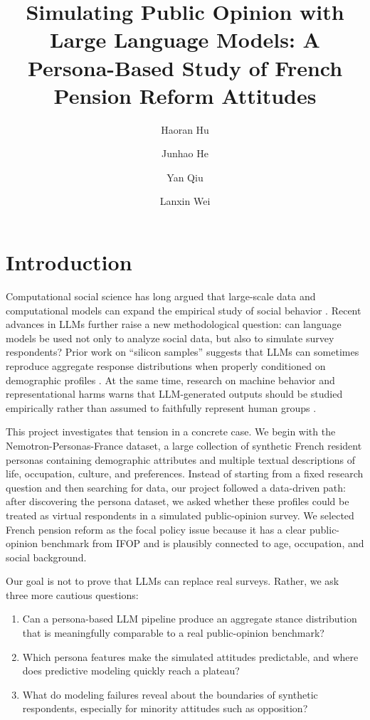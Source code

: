 ﻿\documentclass[sigconf,nonacm]{acmart}
\title{Simulating Public Opinion with Large Language Models: A Persona-Based Study of French Pension Reform Attitudes}
\author{Haoran Hu}
\author{Junhao He}
\author{Yan Qiu}
\author{Lanxin Wei}
\affiliation{%
  \institution{School of Information Management, Nanjing University}
  \country{China}
}
\newcommand{\dataset}{Nemotron-Personas-France}
\newcommand{\ifop}{IFOP}
\begin{document}
\maketitle

\section{Introduction}
Computational social science has long argued that large-scale data and computational models can expand the empirical study of social behavior \cite{lazer2009computational}. Recent advances in LLMs further raise a new methodological question: can language models be used not only to analyze social data, but also to simulate survey respondents? Prior work on ``silicon samples'' suggests that LLMs can sometimes reproduce aggregate response distributions when properly conditioned on demographic profiles \cite{argyle2023out,aher2023using}. At the same time, research on machine behavior and representational harms warns that LLM-generated outputs should be studied empirically rather than assumed to faithfully represent human groups \cite{rahwan2019machine,wang2024replace,cheng2023marked}.

This project investigates that tension in a concrete case. We begin with the \dataset{} dataset, a large collection of synthetic French resident personas containing demographic attributes and multiple textual descriptions of life, occupation, culture, and preferences. Instead of starting from a fixed research question and then searching for data, our project followed a data-driven path: after discovering the persona dataset, we asked whether these profiles could be treated as virtual respondents in a simulated public-opinion survey. We selected French pension reform as the focal policy issue because it has a clear public-opinion benchmark from \ifop{} and is plausibly connected to age, occupation, and social background.

Our goal is not to prove that LLMs can replace real surveys. Rather, we ask three more cautious questions:

\begin{enumerate}[leftmargin=*]
  \item Can a persona-based LLM pipeline produce an aggregate stance distribution that is meaningfully comparable to a real public-opinion benchmark?
  \item Which persona features make the simulated attitudes predictable, and where does predictive modeling quickly reach a plateau?
  \item What do modeling failures reveal about the boundaries of synthetic respondents, especially for minority attitudes such as opposition?
\end{enumerate}
\end{document}
